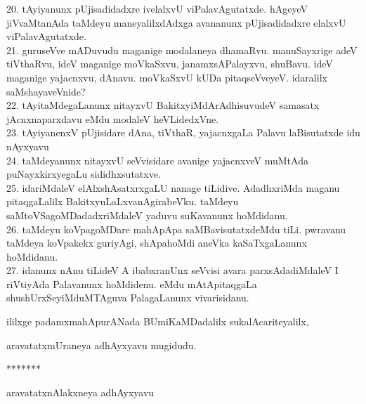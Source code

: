 \documentclass{article}
\begin{document}
20. tAyiyanunx pUjisadidadxre ivelalxvU viPalavAgutatxde. hAgeyeV jiVvaMtanAda taMdeyu maneyalilxdAdxga avananunx pUjisadidadxre elalxvU viPalavAgutatxde.\\
21. guruseVve mADuvudu maganige modalaneya dhamaRvu. manuSayxrige adeV tiVthaRvu, ideV maganige moVkaSxvu, janamxsAPalayxvu, shuBavu. ideV maganige yajacnxvu, dAnavu. moVkaSxvU kUDa pitaqseVveyeV. idaralilx saMshayaveVnide?\\
22. tAyitaMdegaLanunx nitayxvU BakitxyiMdArAdhisuvudeV samasatx jAcnxnaparxdavu eMdu modaleV heVLidedxVne.\\
23. tAyiyanenxV pUjisidare dAna, tiVthaR, yajacnxgaLa Palavu laBisutatxde idu nAyxyavu\\
24. taMdeyanunx nitayxvU seVvisidare avanige yajacnxveV muMtAda puNayxkirxyegaLu sididhxsutatxve.\\
25. idariMdaleV elAlxshAsatxrxgaLU nanage tiLidive. AdadhxriMda maganu pitaqgaLalilx BakitxyuLaLxvanAgirabeVku. taMdeyu saMtoVSagoMDadadxriMdaleV yaduvu suKavanunx hoMdidanu.\\
26. taMdeyu koVpagoMDare mahApApa saMBavisutatxdeMdu tiLi. pwravanu taMdeya koVpakekx guriyAgi, shApahoMdi aneVka kaSaTxgaLanunx hoMdidanu.\\
27. idanunx nAnu tiLideV A ibabxranUnx seVvisi avara parxsAdadiMdaleV I riVtiyAda Palavanunx hoMdidenu. eMdu mAtApitaqgaLa shushUrxSeyiMduMTAguva PalagaLanunx vivarisidanu.\\

\begin{center}
ililxge padamxmahApurANada BUmiKaMDadalilx sukalAcariteyalilx,
\end{center}

\begin{center}
aravatatxmUraneya adhAyxyavu mugidudu.
\end{center}

\begin{center}
*******
\end{center}

\begin{center}
aravatatxnAlakxneya adhAyxyavu
\end{center}
\end{document}
